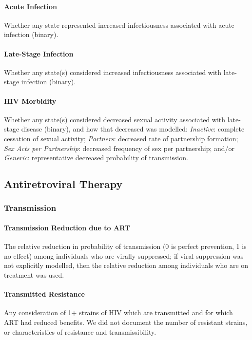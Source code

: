 \paragraph{Acute Infection}
Whether any state represented increased infectiousness associated with acute infection (binary).
\paragraph{Late-Stage Infection}
Whether any state(s) considered increased infectiousness associated with late-stage infection (binary).
\paragraph{HIV Morbidity}
Whether any state(s) considered decreased sexual activity associated with late-stage disease (binary),
and how that decreased was modelled:
\emph{Inactive}: complete cessation of sexual activity;
\emph{Partners}: decreased rate of partnership formation;
\emph{Sex Acts per Partnership}: decreased frequency of sex per partnership; and/or
\emph{Generic}: representative decreased probability of transmission.
\subsection{Antiretroviral Therapy}
\label{aa:defs:art}
\subsubsection{Transmission}
\label{aaa:defs:trans}
\paragraph{Transmission Reduction due to ART}
The relative reduction in probability of transmission
(0 is perfect prevention, 1 is no effect)
among individuals who are virally suppressed;
if viral suppression was not explicitly modelled,
then the relative reduction among individuals who are on treatment was used.
\paragraph{Transmitted Resistance}
Any consideration of 1+ strains of HIV which are transmitted and for which ART had reduced benefits.
We did not document the number of resistant strains,
or characteristics of resistance and transmissibility.
